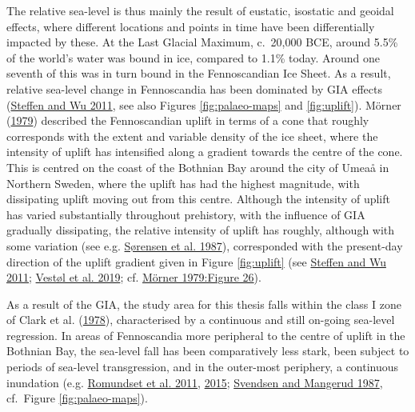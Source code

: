 \documentclass[
  12pt,
  a4paper,
  oneside]{book}
\begin{document}
The relative sea-level is thus mainly the result of eustatic, isostatic and geoidal effects, where different locations and points in time have been differentially impacted by these. At the Last Glacial Maximum, c.~20,000 BCE, around 5.5\% of the world's water was bound in ice, compared to 1.1\% today. Around one seventh of this was in turn bound in the Fennoscandian Ice Sheet. As a result, relative sea-level change in Fennoscandia has been dominated by GIA effects (\protect\hyperlink{ref-steffen2011}{Steffen and Wu 2011}, see also Figures \ref{fig:palaeo-maps} and \ref{fig:uplift}). Mörner (\protect\hyperlink{ref-muxf6rner1979}{1979}) described the Fennoscandian uplift in terms of a cone that roughly corresponds with the extent and variable density of the ice sheet, where the intensity of uplift has intensified along a gradient towards the centre of the cone. This is centred on the coast of the Bothnian Bay around the city of Umeaå in Northern Sweden, where the uplift has had the highest magnitude, with dissipating uplift moving out from this centre. Although the intensity of uplift has varied substantially throughout prehistory, with the influence of GIA gradually dissipating, the relative intensity of uplift has roughly, although with some variation (see e.g. \protect\hyperlink{ref-suxf8rensen1987}{Sørensen et al. 1987}), corresponded with the present-day direction of the uplift gradient given in Figure \ref{fig:uplift} (see \protect\hyperlink{ref-steffen2011}{Steffen and Wu 2011}; \protect\hyperlink{ref-vestol2019}{Vestøl et al. 2019}; cf. \protect\hyperlink{ref-muxf6rner1979}{Mörner 1979:Figure 26}).

As a result of the GIA, the study area for this thesis falls within the class I zone of Clark et al. (\protect\hyperlink{ref-clark1978}{1978}), characterised by a continuous and still on-going sea-level regression. In areas of Fennoscandia more peripheral to the centre of uplift in the Bothnian Bay, the sea-level fall has been comparatively less stark, been subject to periods of sea-level transgression, and in the outer-most periphery, a continuous inundation (e.g. \protect\hyperlink{ref-romundset2011}{Romundset et al. 2011}, \protect\hyperlink{ref-romundset2015}{2015}; \protect\hyperlink{ref-svendsen1987}{Svendsen and Mangerud 1987}, cf.~Figure \ref{fig:palaeo-maps}).
\end{document}
